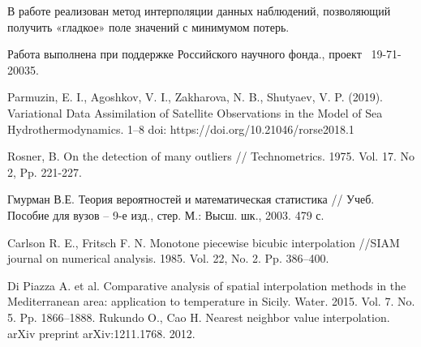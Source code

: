   

В работе реализован метод интерполяции данных наблюдений, позволяющий получить «гладкое» поле значений с минимумом потерь.


Работа выполнена при поддержке Российского научного фонда., проект \textnumero~19-71-20035.
%



\begin{thebibliography}{9} %
 Parmuzin, E. I., Agoshkov, V. I., Zakharova, N. B., Shutyaev, V. P. (2019). Variational Data Assimilation of Satellite Observations in the Model of Sea Hydrothermodynamics. 1--8 doi: https://doi.org/10.21046/rorse2018.1

 Rosner, B. On the detection of many outliers // Technometrics. 1975. Vol. 17. No 2, Pp. 221-227.

 Гмурман В.Е. Теория вероятностей и математическая статистика // Учеб. Пособие для вузов – 9-е изд., стер. М.: Высш. шк., 2003. 479 с.

 Carlson R. E., Fritsch F. N. Monotone piecewise bicubic interpolation //SIAM journal on numerical analysis.  1985.  Vol. 22, No. 2. Pp. 386--400.

 Di Piazza A. et al. Comparative analysis of spatial interpolation methods in the Mediterranean area: application to temperature in Sicily. Water.  2015.  Vol. 7. No. 5.  Pp. 1866--1888.
Rukundo O., Cao H. Nearest neighbor value interpolation. arXiv preprint arXiv:1211.1768.  2012.


\end{thebibliography}





%

